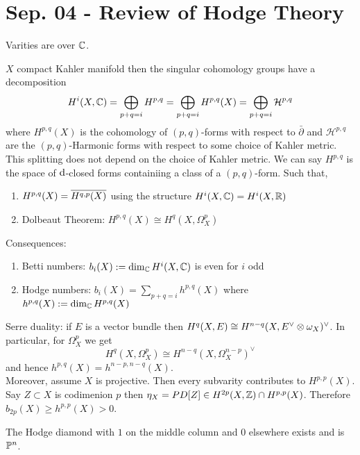 \documentclass[12pt]{article}
\newcommand{\dbar}{\bar{\partial}}
\renewcommand{\cH}{\mathcal{H}}
\begin{document}
 
\section{Sep. 04 - Review of Hodge Theory}

Varities are over $\CC$.


\begin{theorem}
$X$ compact Kahler manifold then the singular cohomology groups have a decomposition
\[ H^i(X, \CC) = \bigoplus_{p + q = i} H^{p,q} = \bigoplus_{p + q = i} H^{p,q}(X) = \bigoplus_{p + q = i} \cH^{p,q} \]
where $H^{p,q}(X)$ is the cohomology of $(p,q)$-forms with respect to $\dbar$ and $\cH^{p,q}$ are the $(p,q)$-Harmonic forms with respect to some choice of Kahler metric. This splitting does not depend on the choice of Kahler metric. We can say $H^{p,q}$ is the space of $\d$-closed forms containiing a class of a $(p,q)$-form. Such that,
\begin{enumerate}
\item $H^{p,q}(X) = \ol{H^{q,p}(X)}$ using the structure $H^i(X, \CC) = H^i(X, \RR)$
\item Dolbeaut Theorem: $H^{p,q}(X) \cong H^q(X, \Omega^p_X)$ 
\end{enumerate} 
\end{theorem} 

Consequences:
\begin{enumerate}
\item Betti numbers: $b_i(X) := \dim_{\CC} H^i(X, \CC)$ is even for $i$ odd
\item Hodge numbers: $b_i(X) = \sum_{p+q = i} h^{p,q}(X)$ where $h^{p,q}(X) := \dim_{\CC} H^{p,q}(X)$
\end{enumerate}

Serre duality: if $E$ is a vector bundle then $H^q(X, E) \cong H^{n-q}(X, E^\vee \ot \omega_X)^\vee$. In particular, for $\Omega_X^p$ we get
\[ H^q(X, \Omega_X^p) \cong H^{n-q}(X, \Omega_X^{n-p})^\vee \]
and hence $h^{p,q}(X) = h^{n-p,n-q}(X)$. 
\bigskip\\
Moreover, assume $X$ is projective. Then every subvarity contributes to $H^{p,p}(X)$. Say $Z \subset X$ is codimenion $p$ then $\eta_X = PD[Z] \in H^{2p}(X, \Z) \cap H^{p,p}(X)$. Therefore $b_{2p}(X) \ge h^{p,p}(X) > 0$. 

\begin{example}
The Hodge diamond with $1$ on the middle column and 0 elsewhere exists and is $\P^n$. 
\end{example}
\end{document}
